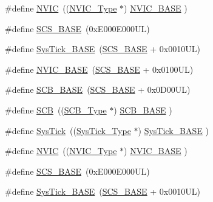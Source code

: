 \begin{DoxyCompactItemize}
\item 
\#define \hyperlink{group___c_m_s_i_s__core__base_gac8e97e8ce56ae9f57da1363a937f8a17}{N\+V\+IC}~((\hyperlink{struct_n_v_i_c___type}{N\+V\+I\+C\+\_\+\+Type}      $\ast$)     \hyperlink{group___c_m_s_i_s__core__base_gaa0288691785a5f868238e0468b39523d}{N\+V\+I\+C\+\_\+\+B\+A\+SE}     )
\item 
\#define \hyperlink{group___c_m_s_i_s__core__base_ga3c14ed93192c8d9143322bbf77ebf770}{S\+C\+S\+\_\+\+B\+A\+SE}~(0x\+E000\+E000\+U\+L)
\item 
\#define \hyperlink{group___c_m_s_i_s__core__base_ga58effaac0b93006b756d33209e814646}{Sys\+Tick\+\_\+\+B\+A\+SE}~(\hyperlink{group___c_m_s_i_s__core__base_ga3c14ed93192c8d9143322bbf77ebf770}{S\+C\+S\+\_\+\+B\+A\+SE} +  0x0010\+U\+L)
\item 
\#define \hyperlink{group___c_m_s_i_s__core__base_gaa0288691785a5f868238e0468b39523d}{N\+V\+I\+C\+\_\+\+B\+A\+SE}~(\hyperlink{group___c_m_s_i_s__core__base_ga3c14ed93192c8d9143322bbf77ebf770}{S\+C\+S\+\_\+\+B\+A\+SE} +  0x0100\+U\+L)
\item 
\#define \hyperlink{group___c_m_s_i_s__core__base_gad55a7ddb8d4b2398b0c1cfec76c0d9fd}{S\+C\+B\+\_\+\+B\+A\+SE}~(\hyperlink{group___c_m_s_i_s__core__base_ga3c14ed93192c8d9143322bbf77ebf770}{S\+C\+S\+\_\+\+B\+A\+SE} +  0x0\+D00\+U\+L)
\item 
\#define \hyperlink{group___c_m_s_i_s__core__base_gaaaf6477c2bde2f00f99e3c2fd1060b01}{S\+CB}~((\hyperlink{struct_s_c_b___type}{S\+C\+B\+\_\+\+Type}       $\ast$)     \hyperlink{group___c_m_s_i_s__core__base_gad55a7ddb8d4b2398b0c1cfec76c0d9fd}{S\+C\+B\+\_\+\+B\+A\+SE}      )
\item 
\#define \hyperlink{group___c_m_s_i_s__core__base_gacd96c53beeaff8f603fcda425eb295de}{Sys\+Tick}~((\hyperlink{struct_sys_tick___type}{Sys\+Tick\+\_\+\+Type}   $\ast$)     \hyperlink{group___c_m_s_i_s__core__base_ga58effaac0b93006b756d33209e814646}{Sys\+Tick\+\_\+\+B\+A\+SE}  )
\item 
\#define \hyperlink{group___c_m_s_i_s__core__base_gac8e97e8ce56ae9f57da1363a937f8a17}{N\+V\+IC}~((\hyperlink{struct_n_v_i_c___type}{N\+V\+I\+C\+\_\+\+Type}      $\ast$)     \hyperlink{group___c_m_s_i_s__core__base_gaa0288691785a5f868238e0468b39523d}{N\+V\+I\+C\+\_\+\+B\+A\+SE}     )
\item 
\#define \hyperlink{group___c_m_s_i_s__core__base_ga3c14ed93192c8d9143322bbf77ebf770}{S\+C\+S\+\_\+\+B\+A\+SE}~(0x\+E000\+E000\+U\+L)
\item 
\#define \hyperlink{group___c_m_s_i_s__core__base_ga58effaac0b93006b756d33209e814646}{Sys\+Tick\+\_\+\+B\+A\+SE}~(\hyperlink{group___c_m_s_i_s__core__base_ga3c14ed93192c8d9143322bbf77ebf770}{S\+C\+S\+\_\+\+B\+A\+SE} +  0x0010\+U\+L)

\end{DoxyCompactItemize}
